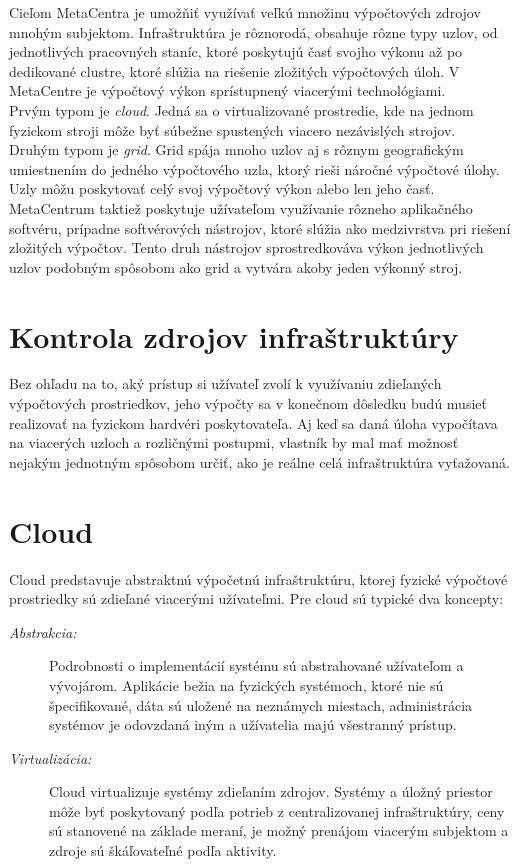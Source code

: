 \documentclass[printed,11pt,twoside,color,cover,table]{fithesis3}
\begin{document}
Cieľom MetaCentra je umožňiť využívať veľkú množinu výpočtových zdrojov mnohým subjektom. Infraštruktúra je rôznorodá, obsahuje rôzne typy uzlov, od jednotlivých pracovných staníc, ktoré poskytujú
časť svojho výkonu až po dedikované clustre, ktoré slúžia na riešenie zložitých výpočtových úloh. V MetaCentre je výpočtový výkon sprístupnený viacerými technológiami.
\\Prvým typom je \textit{cloud}. Jedná sa o virtualizované prostredie, kde na jednom fyzickom stroji môže byť súbežne spustených viacero nezávislých strojov.
\\Druhým typom je \textit{grid}. Grid spája mnoho uzlov aj s rôznym geografickým umiestnením do jedného výpočtového uzla, ktorý rieši náročné výpočtové úlohy. Uzly môžu poskytovať celý svoj výpočtový výkon
alebo len jeho časť.
\\MetaCentrum taktiež poskytuje užívateľom využívanie rôzneho aplikačného softvéru, prípadne softvérových nástrojov, ktoré slúžia ako medzivrstva pri riešení zložitých výpočtov. Tento druh nástrojov
sprostredkováva výkon jednotlivých uzlov podobným spôsobom ako grid a vytvára akoby jeden výkonný stroj.

\section{Kontrola zdrojov infraštruktúry}
Bez ohľadu na to, aký prístup si užívateľ zvolí k využívaniu zdieľaných výpočtových prostriedkov, jeho výpočty sa v konečnom dôsledku budú musieť realizovať na fyzickom hardvéri poskytovateľa. 
Aj keď sa daná úloha vypočítava na viacerých uzloch a rozličnými postupmi, vlastník by mal mať možnosť nejakým jednotným spôsobom určiť, ako je reálne celá infraštruktúra vyťažovaná.

\section{Cloud}
Cloud predstavuje abstraktnú výpočetnú infraštruktúru, ktorej fyzické výpočtové prostriedky sú zdieľané viacerými užívateľmi. 
Pre cloud sú typické dva koncepty:
\begin{description}
\item[\emph{Abstrakcia:}] Podrobnosti o implementácií systému sú abstrahované užívateľom a vývojárom. Aplikácie bežia na fyzických systémoch,
ktoré nie sú špecifikované, dáta sú uložené na neznámych miestach, administrácia systémov je odovzdaná iným a užívatelia majú
všestranný prístup.
\item[\emph{Virtualizácia:}] Cloud virtualizuje systémy zdieľaním zdrojov. Systémy a úložný priestor môže byť poskytovaný podľa potrieb z 
centralizovanej infraštruktúry, ceny sú stanovené na základe meraní, je možný prenájom viacerým subjektom a zdroje sú škáľovateľné podľa aktivity.
\end{description}
\cite{cloud_bible}
\end{document}
